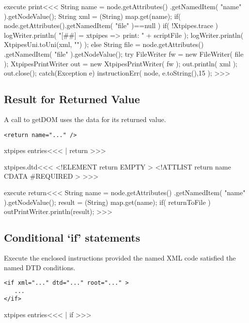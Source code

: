 \documentclass{article}
\begin{document}
{\<execute print\><<<
String name = node.getAttributes()
                 .getNamedItem( "name" ).getNodeValue();
String xml = (String) map.get(name);
if( node.getAttributes().getNamedItem( "file" )==null ){
   if( !Xtpipes.trace ){
      logWriter.println( "[##]  = xtpipes => print: " + scriptFile );
   }
   logWriter.println( XtpipesUni.toUni(xml, "") );
} else {
   String file = node.getAttributes()
                 .getNamedItem( "file" ).getNodeValue();
   try{
       FileWriter fw = new FileWriter( file );
       XtpipesPrintWriter out = new XtpipesPrintWriter( fw );
       out.println( xml );
       out.close();
   } catch(Exception e){
       instructionErr( node, e.toString(),15 );
}  }
>>>




\subsection{Result for Returned Value}

A call to getDOM uses the data for its returned value.

\begin{verbatim}
<return name="..." />
\end{verbatim}



\<xtpipes entries\><<<
| return
>>>


\<xtpipes.dtd\><<<
<!ELEMENT return EMPTY >
<!ATTLIST return
          name CDATA #REQUIRED
>
>>>



\<execute return\><<<
String name = node.getAttributes()
                 .getNamedItem( "name" ).getNodeValue();
result = (String) map.get(name);
if( returnToFile ){
   outPrintWriter.println(result);
}
>>>




\subsection{Conditional `if' statements}

Execute the enclosed instructions provided the named XML code
satisfied the named DTD conditions.

\begin{verbatim}
<if xml="..." dtd="..." root="..." >
   ...
</if>
\end{verbatim}


\<xtpipes entries\><<<
| if
>>>


}
\end{document}
